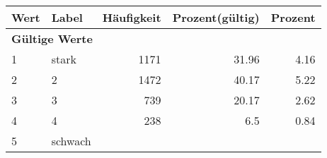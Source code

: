      \begin{longtable}{lXrrr}
     \toprule
     \textbf{Wert} & \textbf{Label} & \textbf{Häufigkeit} & \textbf{Prozent(gültig)} & \textbf{Prozent} \\
     \endhead
     \midrule
     \multicolumn{5}{l}{\textbf{Gültige Werte}}\\

     1 &
     \multicolumn{1}{X}{ stark   } &


       \num{1171} &
       \num[round-mode=places,round-precision=2]{31.96} &
         \num[round-mode=places,round-precision=2]{4.16} \\

     2 &
     \multicolumn{1}{X}{ 2   } &


       \num{1472} &
       \num[round-mode=places,round-precision=2]{40.17} &
         \num[round-mode=places,round-precision=2]{5.22} \\

     3 &
     \multicolumn{1}{X}{ 3   } &


       \num{739} &
       \num[round-mode=places,round-precision=2]{20.17} &
         \num[round-mode=places,round-precision=2]{2.62} \\

     4 &
     \multicolumn{1}{X}{ 4   } &


       \num{238} &
       \num[round-mode=places,round-precision=2]{6.5} &
         \num[round-mode=places,round-precision=2]{0.84} \\

     5 &
     \multicolumn{1}{X}{ schwach   } &



\end{longtable}
